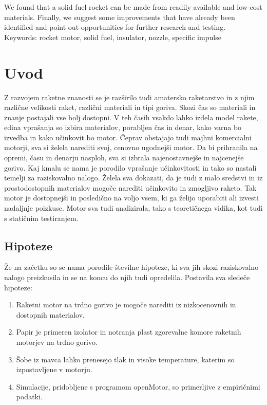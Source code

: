 \documentclass[titlepage, a4paper, twoside, final, 12pt]{article}
\begin{document}
		We found that a solid fuel rocket can be made from readily available and low-cost materials. Finally, we suggest some improvements that have already been identified and point out opportunities for further research and testing.
		\\[2ex]
		Keywords: rocket motor, solid fuel, insulator, nozzle, specific impulse
	

	\tableofcontents

	\listoftables

	\listoffigures

	\newpage

	\renewcommand{\thepage}{\arabic{page}}

		\section{Uvod}
		Z razvojem raketne znanosti se je razširilo tudi amatersko raketarstvo in z njim različne velikosti raket, različni materiali in tipi goriva. Skozi čas so
		materiali in znanje postajali vse bolj dostopni. V teh časih vsakdo lahko izdela model rakete, edina vprašanja so izbira materialov,
		porabljen čas in denar, kako varna bo izvedba in kako učinkovit bo motor. Čeprav obstajajo tudi majhni komercialni motorji, sva si želela narediti svoj, cenovno ugodnejši motor.
		Da bi prihranila na opremi, času in denarju nasploh, sva si izbrala najenostavnejše in najcenejše gorivo. Kaj kmalu se nama je porodilo vprašanje
		učinkovitosti in tako so nastali temelji za raziskovalno nalogo. Želela sva dokazati, da je tudi z malo sredstvi in iz
		prostodostopnih materialov mogoče narediti učinkovito in zmogljivo raketo. Tak motor je dostopnejši in posledično na voljo vsem, ki ga želijo uporabiti ali izvesti nadaljnje poizkuse.
		Motor sva tudi analizirala, tako s teoretičnega vidika, kot tudi s statičnim testiranjem.
		
		\subsection{Hipoteze}
		Že na začetku so se nama porodile številne hipoteze, ki sva jih skozi raziskovalno nalogo preizkusila in se na koncu do njih tudi opredelila.
		Postavila sva sledeče hipoteze:
		\begin{enumerate}
				\item Raketni motor na trdno gorivo je mogoče narediti iz nizkocenovnih in dostopnih materialov.
				\item Papir je primeren izolator in notranja plast zgorevalne komore raketnih motorjev na trdno gorivo.
				\item Šobe iz mavca lahko prenesejo tlak in visoke temperature, katerim so izpostavljene v motorju.
				\item Simulacije, pridobljene s programom openMotor, so primerljive z empiričnimi podatki.
		\end{enumerate}
\end{document}
